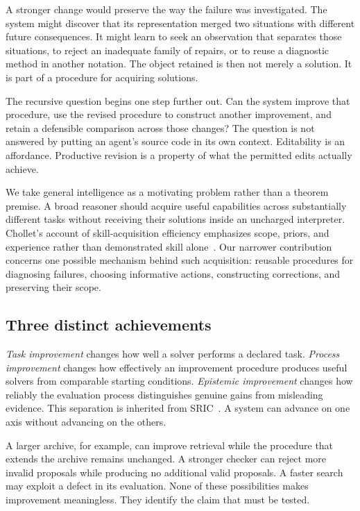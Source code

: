 \documentclass[11pt,letterpaper]{article}
\theoremstyle{plain}
\theoremstyle{definition}
\begin{document}
A stronger change would preserve the way the failure was investigated. The system might discover that its representation merged two situations with different future consequences. It might learn to seek an observation that separates those situations, to reject an inadequate family of repairs, or to reuse a diagnostic method in another notation. The object retained is then not merely a solution. It is part of a procedure for acquiring solutions.

The recursive question begins one step further out. Can the system improve that procedure, use the revised procedure to construct another improvement, and retain a defensible comparison across those changes? The question is not answered by putting an agent's source code in its own context. Editability is an affordance. Productive revision is a property of what the permitted edits actually achieve.

We take general intelligence as a motivating problem rather than a theorem premise. A broad reasoner should acquire useful capabilities across substantially different tasks without receiving their solutions inside an uncharged interpreter. Chollet's account of skill-acquisition efficiency emphasizes scope, priors, and experience rather than demonstrated skill alone~\cite{chollet}. Our narrower contribution concerns one possible mechanism behind such acquisition: reusable procedures for diagnosing failures, choosing informative actions, constructing corrections, and preserving their scope.

\subsection{Three distinct achievements}
\emph{Task improvement} changes how well a solver performs a declared task. \emph{Process improvement} changes how effectively an improvement procedure produces useful solvers from comparable starting conditions. \emph{Epistemic improvement} changes how reliably the evaluation process distinguishes genuine gains from misleading evidence. This separation is inherited from SRIC~\cite{sric}. A system can advance on one axis without advancing on the others.

A larger archive, for example, can improve retrieval while the procedure that extends the archive remains unchanged. A stronger checker can reject more invalid proposals while producing no additional valid proposals. A faster search may exploit a defect in its evaluation. None of these possibilities makes improvement meaningless. They identify the claim that must be tested.
\end{document}
